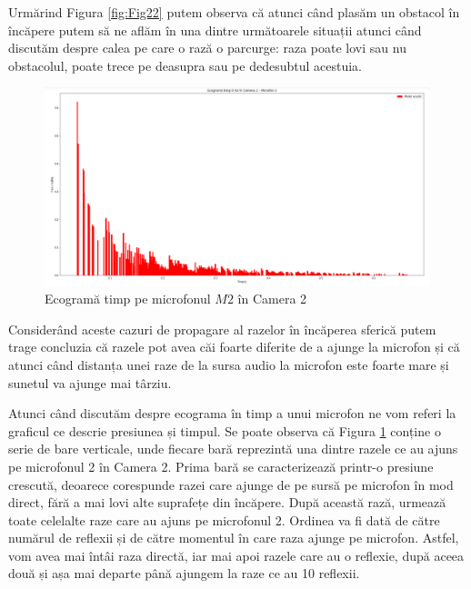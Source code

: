 	Urmărind Figura \ref{fig:Fig22} putem observa că atunci când plasăm un obstacol în încăpere putem să ne aflăm în una dintre următoarele situații atunci când discutăm despre calea pe care o rază o parcurge: raza poate lovi sau nu obstacolul, poate trece pe deasupra sau pe dedesubtul acestuia.
	
	\begin{figure}[!htb]
		\centering
		\includegraphics[width=1\linewidth]{imagini/ecograma.png}
		\caption{Ecogramă timp pe microfonul $M2$ în Camera 2}
		\label{Fig23}
	\end{figure}
	
	Considerând aceste cazuri de propagare al razelor în încăperea sferică putem trage concluzia că razele pot avea căi foarte diferite de a ajunge la microfon și că atunci când distanța unei raze de la sursa audio la microfon este foarte mare și sunetul va ajunge mai târziu.
	
	Atunci când discutăm despre ecograma în timp a unui microfon ne vom referi la graficul ce descrie presiunea și timpul. Se poate observa că Figura \ref{Fig23} conține o serie de bare verticale, unde fiecare bară reprezintă una dintre razele ce au ajuns pe microfonul 2 în Camera 2. Prima bară se caracterizează printr-o presiune crescută, deoarece corespunde razei care ajunge de pe sursă pe microfon în mod direct, fără a mai lovi alte suprafețe din încăpere. După această rază, urmează toate celelalte raze care au ajuns pe microfonul 2. Ordinea va fi dată de către numărul de reflexii și de către momentul în care raza ajunge pe microfon. Astfel, vom avea mai întâi raza directă, iar mai apoi razele care au o reflexie, după aceea două și așa mai departe până ajungem la raze ce au 10 reflexii.

